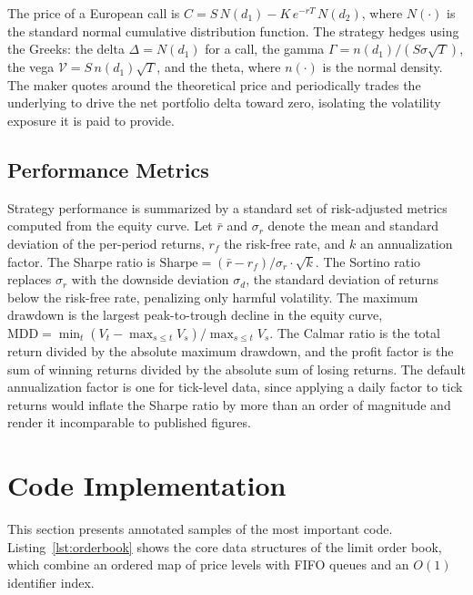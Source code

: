 \documentclass[12pt,oneside,a4paper]{report}
\begin{document}
The price of a European call is $C = S\,N(d_1) - K\,e^{-rT}\,N(d_2)$, where $N(\cdot)$ is the standard normal cumulative distribution function. The strategy hedges using the Greeks: the delta $\Delta = N(d_1)$ for a call, the gamma $\Gamma = n(d_1)/(S\sigma\sqrt{T})$, the vega $\mathcal{V} = S\,n(d_1)\sqrt{T}$, and the theta, where $n(\cdot)$ is the normal density. The maker quotes around the theoretical price and periodically trades the underlying to drive the net portfolio delta toward zero, isolating the volatility exposure it is paid to provide.

\subsection{Performance Metrics}

Strategy performance is summarized by a standard set of risk-adjusted metrics computed from the equity curve. Let $\bar{r}$ and $\sigma_r$ denote the mean and standard deviation of the per-period returns, $r_f$ the risk-free rate, and $k$ an annualization factor. The Sharpe ratio is $\text{Sharpe} = (\bar{r} - r_f)/\sigma_r \cdot \sqrt{k}$. The Sortino ratio replaces $\sigma_r$ with the downside deviation $\sigma_d$, the standard deviation of returns below the risk-free rate, penalizing only harmful volatility. The maximum drawdown is the largest peak-to-trough decline in the equity curve, $\text{MDD} = \min_t (V_t - \max_{s \leq t} V_s)/\max_{s \leq t} V_s$. The Calmar ratio is the total return divided by the absolute maximum drawdown, and the profit factor is the sum of winning returns divided by the absolute sum of losing returns. The default annualization factor is one for tick-level data, since applying a daily factor to tick returns would inflate the Sharpe ratio by more than an order of magnitude and render it incomparable to published figures.

\section{Code Implementation}
\label{sec:code}

This section presents annotated samples of the most important code. Listing~\ref{lst:orderbook} shows the core data structures of the limit order book, which combine an ordered map of price levels with FIFO queues and an $O(1)$ identifier index.
\end{document}
